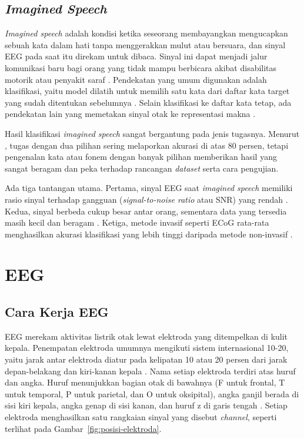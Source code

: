 \subsection{\textit{Imagined Speech}}
\label{sec:imagined-speech}
\textit{Imagined speech} adalah kondisi ketika seseorang membayangkan mengucapkan sebuah kata dalam hati tanpa menggerakkan mulut atau bersuara, dan sinyal EEG pada saat itu direkam untuk dibaca.
Sinyal ini dapat menjadi jalur komunikasi baru bagi orang yang tidak mampu berbicara akibat disabilitas motorik atau penyakit saraf \parencite{lopezbernal2022}.
Pendekatan yang umum digunakan adalah klasifikasi, yaitu model dilatih untuk memilih satu kata dari daftar kata target yang sudah ditentukan sebelumnya \parencite{lopezbernal2022}.
Selain klasifikasi ke daftar kata tetap, ada pendekatan lain yang memetakan sinyal otak ke representasi makna \parencite{tang2023}.

Hasil klasifikasi \textit{imagined speech} sangat bergantung pada jenis tugasnya.
Menurut \textcite{duhair2026}, tugas dengan dua pilihan sering melaporkan akurasi di atas 80 persen, tetapi pengenalan kata atau fonem dengan banyak pilihan memberikan hasil yang sangat beragam dan peka terhadap rancangan \textit{dataset} serta cara pengujian.

Ada tiga tantangan utama.
Pertama, sinyal EEG saat \textit{imagined speech} memiliki rasio sinyal terhadap gangguan (\textit{signal-to-noise ratio} atau SNR) yang rendah \parencite{lopezbernal2022}.
Kedua, sinyal berbeda cukup besar antar orang, sementara data yang tersedia masih kecil dan beragam \parencite{duhair2026}.
Ketiga, metode invasif seperti ECoG rata-rata menghasilkan akurasi klasifikasi yang lebih tinggi daripada metode non-invasif \parencite{lopezbernal2022}.

\section{EEG}
\label{sec:eeg}
\subsection{Cara Kerja EEG}
\label{sec:cara-kerja-eeg}
EEG merekam aktivitas listrik otak lewat elektroda yang ditempelkan di kulit kepala.
Penempatan elektroda umumnya mengikuti sistem internasional 10-20, yaitu jarak antar elektroda diatur pada kelipatan 10 atau 20 persen dari jarak depan-belakang dan kiri-kanan kepala \parencite{britton2016}.
Nama setiap elektroda terdiri atas huruf dan angka.
Huruf menunjukkan bagian otak di bawahnya (F untuk frontal, T untuk temporal, P untuk parietal, dan O untuk oksipital), angka ganjil berada di sisi kiri kepala, angka genap di sisi kanan, dan huruf z di garis tengah \parencite{britton2016}.
Setiap elektroda menghasilkan satu rangkaian sinyal yang disebut \textit{channel}, seperti terlihat pada Gambar~\ref{fig:posisi-elektroda}.

